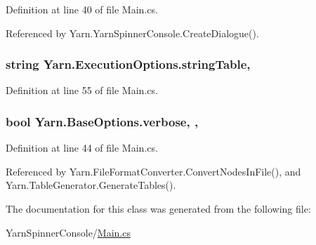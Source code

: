 Definition at line 40 of file Main.\-cs.



Referenced by Yarn.\-Yarn\-Spinner\-Console.\-Create\-Dialogue().

\hypertarget{a00093_a7e43c3b73722956cb0f5d507e4eef527}{
\subsubsection[{string\-Table}]{\setlength{\rightskip}{0pt plus 5cm}string Yarn.\-Execution\-Options.\-string\-Table\hspace{0.3cm}{\ttfamily [get]}, {\ttfamily [set]}}}\label{a00093_a7e43c3b73722956cb0f5d507e4eef527}


Definition at line 55 of file Main.\-cs.

\hypertarget{a00031_ada4d83d1756918f362d55f6649b82b17}{
\subsubsection[{verbose}]{\setlength{\rightskip}{0pt plus 5cm}bool Yarn.\-Base\-Options.\-verbose\hspace{0.3cm}{\ttfamily [get]}, {\ttfamily [set]}, {\ttfamily [inherited]}}}\label{a00031_ada4d83d1756918f362d55f6649b82b17}


Definition at line 44 of file Main.\-cs.



Referenced by Yarn.\-File\-Format\-Converter.\-Convert\-Nodes\-In\-File(), and Yarn.\-Table\-Generator.\-Generate\-Tables().



The documentation for this class was generated from the following file\-:\begin{DoxyCompactItemize}
\item 
Yarn\-Spinner\-Console/\hyperlink{a00307}{Main.\-cs}\end{DoxyCompactItemize}
